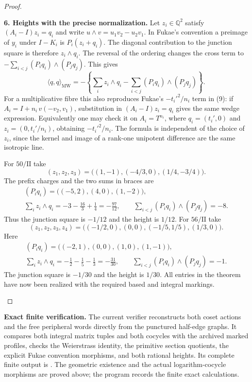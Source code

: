 \begin{proof}
\begin{enumerate}[label=\arabic*.,leftmargin=*]
\par\medskip\noindent\textbf{6. Heights with the precise normalization.}\quad 
Let $z_i\in\mathbb Q^2$ satisfy $(A_i-I)z_i=q_i$ and write
$u\wedge v=u_1v_2-u_2v_1$.  In Fukae's convention a
preimage of $y_i$ under $I-K_i$ is
$P_i(z_i+q_i)$.  The diagonal contribution to the junction
square is therefore $z_i\wedge q_i$.  The reversal of the
ordering changes the cross term to
$-\sum_{i<j}(P_iq_i)\wedge(P_jq_j)$.  This gives
\begin{equation}\label{mapsD:repair:height-formula}
 \langle q,q\rangle_{\mathrm{MW}}
 =-\left\{\sum_i z_i\wedge q_i
       -\sum_{i<j}(P_iq_i)\wedge(P_jq_j)\right\}.
\end{equation}
For a multiplicative fibre this also reproduces Fukae's
$-t_i'^2/n_i$ term in (9): if
$A_i=I+n_i\,v(-v_2,v_1)$, substitution in $(A_i-I)z_i=q_i$
gives the same wedge expression.  Equivalently one may
check it on $A_i=T^{n_i}$, where $q_i=(t_i',0)$ and
$z_i=(0,t_i'/n_i)$, obtaining $-t_i'^2/n_i$.
The formula is independent of the choice of $z_i$, since
the kernel and image of a rank-one unipotent difference
are the same isotropic line.

For $50/\mathrm{II}$ take
\[
 (z_1,z_2,z_3)=
 \bigl((1,-1),(-4/3,0),(1/4,-3/4)\bigr).
\]
The prefix charges and the two sums in braces are
\label{qa:III:layout:2}
\[
\begin{gathered}
 (P_iq_i)=\bigl((-5,2),(4,0),(1,-2)\bigr),\\
 \sum_i z_i\wedge q_i=-3-\frac{16}{3}+\frac14
 =-\frac{97}{12},\qquad
 \sum_{i<j}(P_iq_i)\wedge(P_jq_j)=-8.
\end{gathered}
\]
Thus the junction square is $-1/12$ and the height is $1/12$.
For $56/\mathrm{II}$ take
\[
 (z_1,z_2,z_3,z_4)=
 \bigl((-1/2,0),(0,0),(-1/5,1/5),(1/3,0)\bigr).
\]
Here
\label{qa:III:layout:3}
\[
\begin{gathered}
 (P_iq_i)=\bigl((-2,1),(0,0),(1,0),(1,-1)\bigr),\\
 \sum_i z_i\wedge q_i=-\frac12-\frac15-\frac13
 =-\frac{31}{30},\qquad
 \sum_{i<j}(P_iq_i)\wedge(P_jq_j)=-1.
\end{gathered}
\]
The junction square is $-1/30$ and the height is $1/30$.
All entries in the theorem have now been realized with
the required based and integral markings.
\end{enumerate}
\end{proof}

\label{qa:III:layout:4}
\par\medskip\noindent\textbf{Exact finite verification.}\quad
The current verifier 
reconstructs both coset actions and the free peripheral words directly
from the punctured half-edge graphs. It compares both integral matrix
tuples and both cocycles with the archived marked profiles, checks the
Weierstrass identity, the primitive section quotients, the explicit
Fukae convention morphisms, and both rational heights. Its complete
finite output is .
The geometric existence and the actual logarithm-cocycle morphisms
are proved above; the program records the finite exact calculations.
